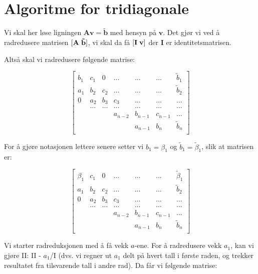 \documentclass[a4paper,10pt,english]{article}
\begin{document}
\section*{Algoritme for tridiagonale}

Vi skal her løse ligningen $\mathbf{A} \mathbf{v} = \mathbf{\tilde{b}}$ med hensyn på $\mathbf{v}$. Det gjør vi ved å radredusere matrisen $[\mathbf{A}\hspace{0.1cm}\mathbf{\tilde{b}}]$, vi skal da få $[\mathbf{I}\hspace{0.1cm}\mathbf{v}]$ der $\mathbf{I}$ er identitetsmatrisen.

Altså skal vi radredusere følgende matrise:

\[
    \begin{bmatrix}
        b_1& c_1 & 0 &\dots   & \dots &\dots &\tilde{b}_1 \\
        a_1 & b_2 & c_2 &\dots &\dots &\dots &\tilde{b}_2 \\
        0 & a_2 & b_3 & c_3 & \dots & \dots &\dots \\
        & \dots   & \dots &\dots   &\dots & \dots &\dots \\
        &   &  &a_{n-2}  &b_{n-1}& c_{n-1} &\dots \\
        &    &  &   &a_{n-1} & b_n &\tilde{b}_n \\
    \end{bmatrix}
\]

For å gjøre notasjonen lettere senere setter vi $b_1 = \beta_1$ og $\tilde{b}_1 = \tilde{\beta}_1$, slik at matrisen er:

\[
    \begin{bmatrix}
        \beta_1& c_1 & 0 &\dots   & \dots &\dots &\tilde{\beta}_1 \\
        a_1 & b_2 & c_2 &\dots &\dots &\dots &\tilde{b}_2 \\
        0 & a_2 & b_3 & c_3 & \dots & \dots &\dots \\
        & \dots   & \dots &\dots   &\dots & \dots &\dots \\
        &   &  &a_{n-2}  &b_{n-1}& c_{n-1} &\dots \\
        &    &  &   &a_{n-1} & b_n &\tilde{b}_n \\
    \end{bmatrix}
\]

Vi starter radreduksjonen med å få vekk $a$-ene. For å radredusere vekk $a_1$, kan vi gjøre II: II - $a_1$/I (dvs. vi regner ut $a_1$ delt på hvert tall i første raden, og trekker resultatet fra tilsvarende tall i andre rad). Da får vi følgende matrise:
\end{document}
